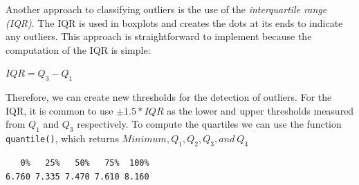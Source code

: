 \documentclass[
  letterpaper,
  DIV=11,
  numbers=noendperiod]{scrreprt}
\newenvironment{Shaded}{\begin{snugshade}}{\end{snugshade}}
\newcommand{\AttributeTok}[1]{\textcolor[rgb]{0.40,0.45,0.13}{#1}}
\newcommand{\CommentTok}[1]{\textcolor[rgb]{0.37,0.37,0.37}{#1}}
\newcommand{\ConstantTok}[1]{\textcolor[rgb]{0.56,0.35,0.01}{#1}}
\newcommand{\DecValTok}[1]{\textcolor[rgb]{0.68,0.00,0.00}{#1}}
\newcommand{\FloatTok}[1]{\textcolor[rgb]{0.68,0.00,0.00}{#1}}
\newcommand{\FunctionTok}[1]{\textcolor[rgb]{0.28,0.35,0.67}{#1}}
\newcommand{\NormalTok}[1]{\textcolor[rgb]{0.00,0.23,0.31}{#1}}
\newcommand{\OtherTok}[1]{\textcolor[rgb]{0.00,0.23,0.31}{#1}}
\newcommand{\SpecialCharTok}[1]{\textcolor[rgb]{0.37,0.37,0.37}{#1}}
\newcommand{\StringTok}[1]{\textcolor[rgb]{0.13,0.47,0.30}{#1}}
\begin{document}
Another approach to classifying outliers is the use of the
\emph{interquartile range (IQR)}. The IQR is used in boxplots and
creates the dots at its ends to indicate any outliers. This approach is
straightforward to implement because the computation of the IQR is
simple:

\label{iqr-formula}
\(IQR = Q_{3}-Q_{1}\)

Therefore, we can create new thresholds for the detection of outliers.
For the IQR, it is common to use \(\pm 1.5 * IQR\) as the lower and
upper thresholds measured from \(Q_1\) and \(Q_3\) respectively. To
compute the quartiles we can use the function \texttt{quantile()}, which
returns \(Minimum, Q_1, Q_2, Q_3, and\ Q_4\)

\begin{Shaded}
\end{Shaded}

\begin{verbatim}
   0%   25%   50%   75%  100% 
6.760 7.335 7.470 7.610 8.160 
\end{verbatim}

\begin{Shaded}
\end{Shaded}
\end{document}
